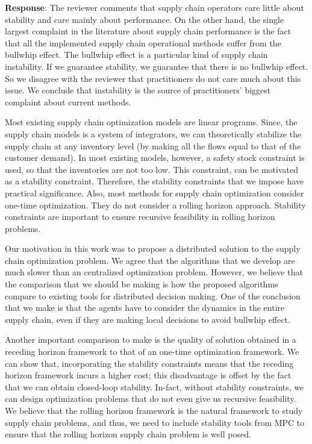 \documentclass{article}
\newcommand{\response}[1]{\textbf{Response}: #1}
\begin{document}
\begin{enumerate}
\response{
The reviewer comments that supply chain operators care little about
stability and care mainly about performance.   On the other hand, the
single largest complaint in the literature about supply chain
performance is the fact that all the implemented supply chain
operational methods suffer from the bullwhip effect. The bullwhip
effect is a particular kind of supply chain instability. If we
guarantee stability, we guarantee that there is no bullwhip effect. So
we disagree with the reviewer that practitioners do not care much
about this issue. We conclude that instability is the source of
practitioners' biggest complaint about current methods.

Most existing supply chain optimization models are linear programs. Since, the supply chain models is a system of integrators, we can theoretically stabilize the supply chain at any inventory level (by making all the flows equal to that of the customer demand). In most existing models, however, a safety stock constraint is used, so that the inventories are not too low. This constraint, can be motivated as a stability constraint. Therefore, the stability constraints that we impose have practical significance. Also, most methods for supply chain optimization consider one-time optimization. They do not consider a rolling horizon approach. Stability constraints are important to ensure recursive feasibility in rolling horizon problems.

Our motivation in this work was to propose a distributed solution to the supply chain optimization problem. We agree that the algorithms that we develop are much slower than an centralized optimization problem.  However, we believe that the comparison that we should be making is how the proposed algorithms compare to existing tools for distributed decision making. One of the conclusion that we make is that the agents have to consider the dynamics in the entire supply chain, even if they are making local decisions to avoid bullwhip effect.

Another important comparison to make is the quality of solution obtained in a receding horizon framework to that of an one-time optimization framework. We can show that, incorporating the stability constraints means that the receding horizon framework incurs a higher cost; this disadvantage is offset by the fact that we can obtain closed-loop stability. In-fact, without stability constraints, we can design optimization problems that do not even give us recursive feasibility. We believe that the rolling horizon framework is the natural framework to study supply chain problems, and thus, we need to include stability tools from MPC to ensure that the rolling horizon supply chain problem is well posed.}


\end{enumerate}
\end{document}
